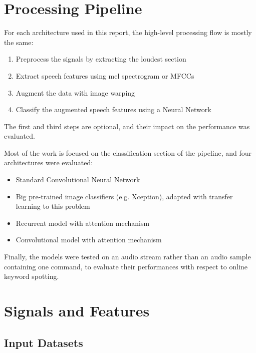 
\section{Processing Pipeline}
\label{sec:processing_architecture}

For each architecture used in this report, the high-level processing flow is
mostly the same:
\begin{enumerate}
    \item Preprocess the signals by extracting the loudest section
    \item Extract speech features using mel spectrogram or MFCCs
    \item Augment the data with image warping
    \item Classify the augmented speech features using a Neural Network
\end{enumerate}
The first and third steps are optional, and their impact on the performance was
evaluated.

Most of the work is focused on the classification section of the pipeline, and
four architectures were evaluated:
\begin{itemize}
    \item Standard Convolutional Neural Network
    \item Big pre-trained image classifiers (e.g. Xception), adapted with
        transfer learning to this problem
    \item Recurrent model with attention mechanism
    \item Convolutional model with attention mechanism
\end{itemize}

Finally, the models were tested on an audio stream rather than an audio sample
containing one command, to evaluate their performances with respect to online
keyword spotting.

\section{Signals and Features}
\label{sec:model}

\subsection{Input Datasets}

